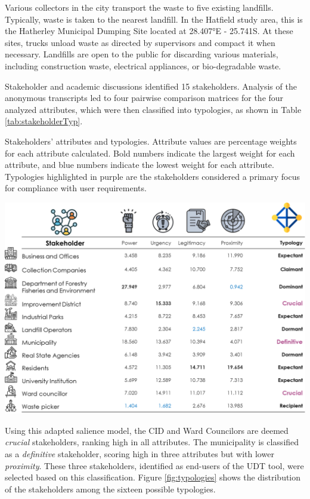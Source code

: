 \documentclass[authoryear,preprint,review,doubleblind, 12pt]{elsarticle}
\begin{document}
Various collectors in the city transport the waste to five existing landfills. Typically, waste is taken to the nearest landfill. In the Hatfield study area, this is the Hatherley Municipal Dumping Site located at 28.407°E - 25.741S. At these sites, trucks unload waste as directed by supervisors and compact it when necessary. Landfills are open to the public for discarding various materials, including construction waste, electrical appliances, or bio-degradable waste.


    Stakeholder and academic discussions identified 15 stakeholders. Analysis of the anonymous transcripts led to four pairwise comparison matrices for the four analyzed attributes, which were then classified into typologies, as shown in Table \ref{tab:stakeholderTyp}. 
    \begin{table}[h!]
    \centering
        \caption{Stakeholders' attributes and typologies. Attribute values are percentage weights for each attribute calculated. Bold numbers indicate the largest weight for each attribute, and blue numbers indicate the lowest weight for each attribute. Typologies highlighted in purple are the stakeholders considered a primary focus for compliance with user requirements.}
        \includegraphics[width=\linewidth]{Figures/stakeholders Result.png}
        \label{tab:stakeholderTyp}    
    \end{table}
   
    Using this adapted salience model, the CID and Ward Councilors are deemed \textit{crucial} stakeholders, ranking high in all attributes. The municipality is classified as a \textit{definitive} stakeholder, scoring high in three attributes but with lower \textit{proximity}. These three stakeholders, identified as end-users of the UDT tool, were selected based on this classification. Figure \ref{fig:typologies} shows the distribution of the stakeholders among the sixteen possible typologies.
\end{document}
